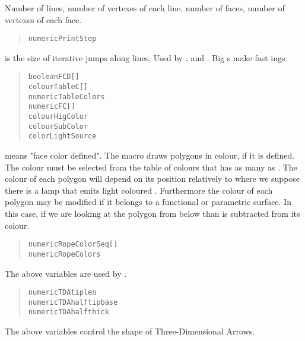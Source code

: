Number of lines, number of vertexes of each line,
number of faces, number of vertexes of each face.
\begin{quote}
\begin{alltt}
numeric PrintStep
\end{alltt}
\end{quote}
 is the size of iterative jumps
along lines. Used by
,  and
.
Big s make fast ings.
\begin{quote}
\begin{alltt}
boolean FCD[]
colour TableC[]
numeric TableColors
numeric FC[]
colour HigColor
colour SubColor
color LightSource
\end{alltt}
\end{quote}
 means "face color defined". The
 macro draws
polygons in colour, if it is defined. The colour must be
selected from the table of colours  that has
as many as . The colour 
of each polygon will depend on its position relatively to
 where we suppose there is a lamp that
emits light coloured . Furthermore the
colour of each polygon may be modified if it belongs to a
functional or parametric surface. In this case, if we are
looking at the polygon from below than  is
subtracted from its colour.
\begin{quote}
\begin{alltt}
numeric RopeColorSeq[]
numeric RopeColors
\end{alltt}
\end{quote}
The above variables are used by .

\begin{quote}
\begin{alltt}
numeric TDAtiplen
numeric TDAhalftipbase
numeric TDAhalfthick
\end{alltt}
\end{quote}
The above variables control the shape of Three-Dimensional Arrows.

